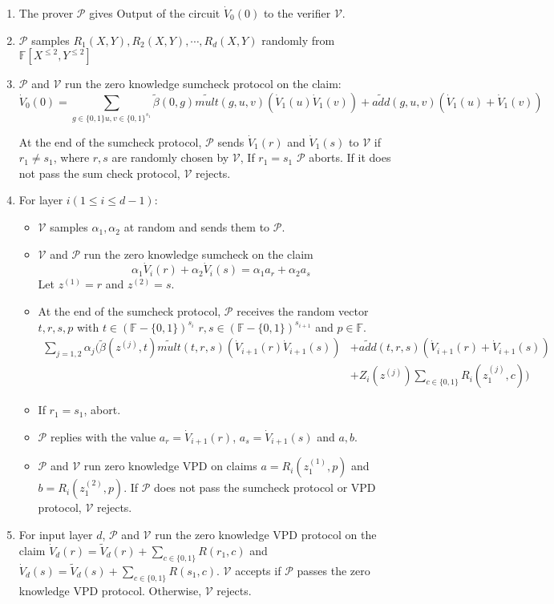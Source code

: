 \begin{enumerate} 
\item The prover $\mathcal{P}$ gives $\text{Output}$ of the circuit $\dot{V}_0(0)$ to the verifier $\mathcal{V}$. 
\item $\mathcal{P}$ samples $R_1(X, Y), R_2(X, Y), \cdots, R_d(X, Y)$ randomly from $\mathbb{F}[X^{\leqslant 2}, Y^{\leqslant 2}]$
\item $\mathcal{P}$ and $\mathcal{V}$ run the zero knowledge sumcheck protocol on the claim:
$$\dot{V}_0(0) = \sum_{g\in\{0,1\} u, v\in \{0,1\}^{s_1}}\tilde{\beta}(0, g)\tilde{mult}(g, u, v)(\dot{V}_1(u)\dot{V}_1(v))+\tilde{add}(g,u,v)(\dot{V}_1(u)+\dot{V}_1(v))$$

At the end of the sumcheck protocol, $\mathcal{P}$ sends $\dot{V}_1(r)$ and $\dot{V}_1(s)$ to $\mathcal{V}$ if $r_1 \neq s_1$, where $r, s$ are randomly chosen by $\mathcal{V}$, If $r_1 = s_1$ $\mathcal{P}$ aborts. If it does not pass the sum check protocol, $\mathcal{V}$ rejects. 

\item For layer $i(1 \leq i \leq d - 1)$:
	\begin{itemize}
	\item $\mathcal{V}$ samples $\alpha_1, \alpha_2$ at random and sends them to $\mathcal{P}$.
	\item $\mathcal{V}$ and $\mathcal{P}$ run the zero knowledge sumcheck on the claim
	$$\alpha_1 \dot{V}_i(r) + \alpha_2 \dot{V}_i(s) = \alpha_1 a_{r} + \alpha_2 a_{s}$$
	Let $z^{(1)} = r$ and $z^{(2)} = s$.
	\item At the end of the sumcheck protocol, $\mathcal{P}$ receives the random vector $t, r, s, p$ with $t \in (\mathbb{F} - \{0, 1\})^{s_i}$ $r, s \in (\mathbb{F} - \{0, 1\})^{s_{i+1}}$ and $p \in \mathbb{F}$. 
	\begin{align*}
		\sum_{j = 1, 2} \alpha_j (\tilde{\beta}(z^{(j)}, t)\tilde{mult}(t, r, s)(\dot{V}_{i+1}(r)\dot{V}_{i+1}(s))&+\tilde{add}(t,r,s)(\dot{V}_{i+1}(r)+\dot{V}_{i+1}(s))\\
 		&+ Z_i(z^{(j)})\sum\limits_{c \in \{0, 1\}}R_i(z^{(j)}_1, c))
	\end{align*}
	\item If $r_1 = s_1$, abort. 
	\item $\mathcal{P}$ replies with the value $a_r = \dot{V}_{i+1}(r)$, $a_s = \dot{V}_{i+1}(s)$ and $a, b$.
	\item $\mathcal{P}$ and $\mathcal{V}$ run zero knowledge VPD on claims $a = R_i(z^{(1)}_1, p)$ and $b = R_i(z^{(2)}_1, p)$. If $\mathcal{P}$ does not pass the sumcheck protocol or VPD protocol, $\mathcal{V}$ rejects.
	\end{itemize}

\item For input layer $d$, $\mathcal{P}$ and $\mathcal{V}$ run the zero knowledge VPD protocol on the claim $\dot{V}_d(r) = \tilde{V}_d(r) + \sum\limits_{c \in \{0, 1\}}R(r_1, c)$ and $\dot{V}_d(s) = \tilde{V}_d(s) + \sum\limits_{c \in \{0, 1\}}R(s_1, c)$. $\mathcal{V}$ accepts if $\mathcal{P}$ passes the zero knowledge VPD protocol. Otherwise, $\mathcal{V}$ rejects. 
\end{enumerate}

